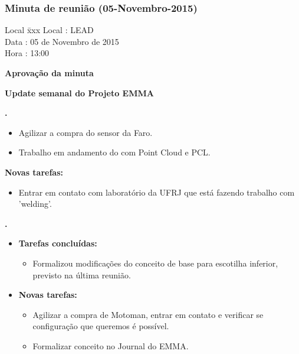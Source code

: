 \subsubsection{Minuta de reunião (05-Novembro-2015)}

\begin{tabbing}
  Local \= xxx \kill
  Local \> : LEAD \\
  Data  \> : 05 de Novembro de 2015 \\
  Hora  \> : 13:00
\end{tabbing} 


\textbf{Aprovação da minuta}

\textbf{Update semanal do Projeto EMMA}
   									
						
\textbf{\gabriel.} 
	\begin{itemize}
			\item Agilizar a compra do sensor da Faro.
			\item Trabalho em andamento do com Point Cloud e PCL.
			\end{itemize}
		
		\item \textbf{Novas tarefas:}
			\begin{itemize} 
				\item Entrar em contato com laboratório da UFRJ que está fazendo trabalho
				com 'welding'.
			\end{itemize}

					
			
   \textbf{.} 
	\begin{itemize}
		\item \textbf{Tarefas concluídas:}
			\begin{itemize}    
			    \item Formalizou modificações do conceito de base para escotilha
			    inferior, previsto na última reunião.
				
			\end{itemize}
		
		\item \textbf{Novas tarefas:}
			\begin{itemize} 
			    \item Agilizar a compra de Motoman, entrar em contato e verificar
			    se configuração que queremos é possível.
			    \item Formalizar conceito no Journal do EMMA.
			\end{itemize}
	\end{itemize}

